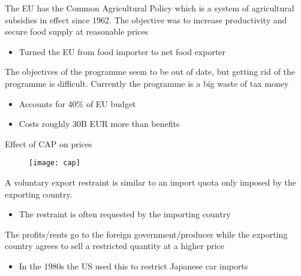 \documentclass{beamer}
\begin{document}
\begin{frame}
  The EU has the Common Agricultural Policy which is a system of agricultural subsidies in effect since 1962.
  The objective was to increase productivity and secure food supply at reasonable prices
  \begin{itemize}
    \item Turned the EU from food importer to net food exporter
  \end{itemize}
  \medskip
  The objectives of the programme seem to be out of date, but getting rid of the programme is difficult.
  Currently the programme is a big waste of tax money
  \begin{itemize}
    \item Accounts for 40\% of EU budget
    \item Costs roughly 30B EUR more than benefits
  \end{itemize}
\end{frame}

\begin{frame}{Effect of CAP on prices}
  \begin{figure}
    \texttt{[image: cap]}
  \end{figure}
\end{frame}

\begin{frame}
  A voluntary export restraint is similar to an import quota only imposed by the exporting country. 
  \begin{itemize}
    \item The restraint is often requested by the importing country
  \end{itemize}
  \medskip
  The profits/rents go to the foreign government/producer while the exporting country agrees to sell a restricted quantity at a higher price
  \begin{itemize}
    \item In the 1980s the US used this to restrict Japanese car imports
  \end{itemize}
\end{frame}
\end{document}
